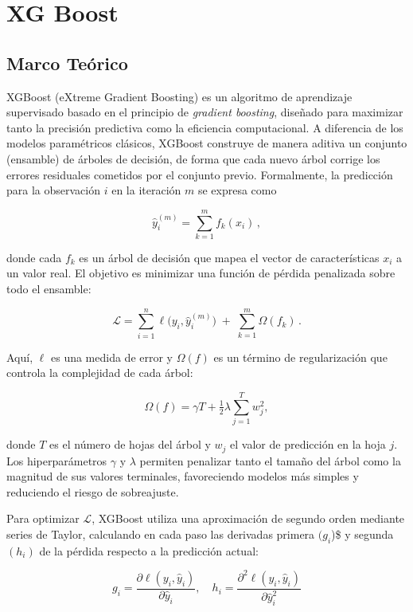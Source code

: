 \documentclass[
  letterpaper,
  DIV=11,
  numbers=noendperiod]{scrartcl}
\begin{document}
\hypertarget{xg-boost}{%
\section{XG Boost}\label{xg-boost}}

\hypertarget{marco-teuxf3rico-1}{%
\subsection{Marco Teórico}\label{marco-teuxf3rico-1}}

XGBoost (eXtreme Gradient Boosting) es un algoritmo de aprendizaje
supervisado basado en el principio de \emph{gradient boosting}, diseñado
para maximizar tanto la precisión predictiva como la eficiencia
computacional. A diferencia de los modelos paramétricos clásicos,
XGBoost construye de manera aditiva un conjunto (ensamble) de árboles de
decisión, de forma que cada nuevo árbol corrige los errores residuales
cometidos por el conjunto previo. Formalmente, la predicción para la
observación \(i\) en la iteración \(m\) se expresa como

\[
\hat{y}_i^{(m)} = \sum_{k=1}^m f_k(x_i)\,,
\]

donde cada \(f_k\) es un árbol de decisión que mapea el vector de
características \(x_i\) a un valor real. El objetivo es minimizar una
función de pérdida penalizada sobre todo el ensamble:

\[
\mathcal{L} = \sum_{i=1}^n \ell\bigl(y_i,\hat{y}_i^{(m)}\bigr) \;+\; \sum_{k=1}^m \Omega(f_k)\,.
\]

Aquí, \(\ell\) es una medida de error y \(\Omega(f)\) es un término de
regularización que controla la complejidad de cada árbol:

\[
\Omega(f) = \gamma T + \tfrac{1}{2} \lambda \sum_{j=1}^T w_j^2,
\]

donde \(T\) es el número de hojas del árbol y \(w_j\) el valor de
predicción en la hoja \(j\). Los hiperparámetros \(\gamma\) y
\(\lambda\) permiten penalizar tanto el tamaño del árbol como la
magnitud de sus valores terminales, favoreciendo modelos más simples y
reduciendo el riesgo de sobreajuste.

Para optimizar \(\mathcal{L}\), XGBoost utiliza una aproximación de
segundo orden mediante series de Taylor, calculando en cada paso las
derivadas primera \((g_i\))\$ y segunda \((h_i)\) de la pérdida respecto
a la predicción actual:

\[
g_i = \frac{\partial \ell(y_i, \hat{y}_i)}{\partial \hat{y}_i}, \quad
h_i = \frac{\partial^2 \ell(y_i, \hat{y}_i)}{\partial \hat{y}_i^2}
\]
\end{document}
